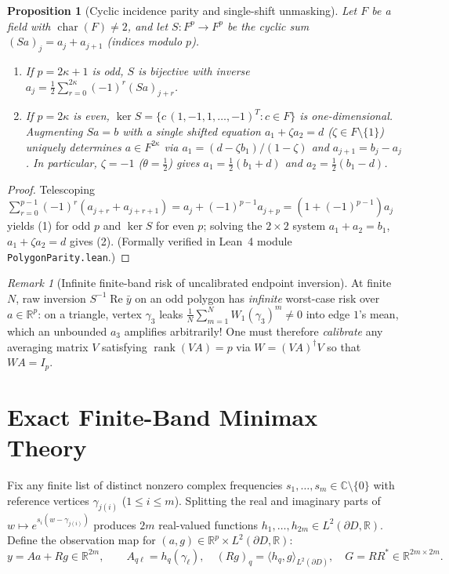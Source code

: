 \documentclass[11pt,reqno]{amsart}
\newtheorem{proposition}[theorem]{Proposition}
\theoremstyle{definition}
\theoremstyle{remark}
\newtheorem{remark}[theorem]{Remark}
\newcommand{\C}{\mathbb{C}}
\newcommand{\R}{\mathbb{R}}
\begin{document}
\begin{proposition}[Cyclic incidence parity and single-shift unmasking]\label{prop:parity}
Let $F$ be a field with $\operatorname{char}(F) \ne 2$, and let $S : F^p \to F^p$ be the cyclic sum $(S a)_j = a_j + a_{j+1}$ (indices modulo $p$).
\begin{enumerate}
  \item If $p = 2\kappa+1$ is odd, $S$ is bijective with inverse $a_j = \frac{1}{2}\sum_{r=0}^{2\kappa} (-1)^r (S a)_{j+r}$.
  \item If $p = 2\kappa$ is even, $\ker S = \{c\,(1, -1, 1, \dots, -1)^T : c \in F\}$ is one-dimensional. Augmenting $S a = b$ with a single shifted equation $a_1 + \zeta a_2 = d$ ($\zeta \in F \setminus \{1\}$) uniquely determines $a \in F^{2\kappa}$ via $a_1 = (d - \zeta b_1)/(1 - \zeta)$ and $a_{j+1} = b_j - a_j$. In particular, $\zeta = -1$ ($\theta = \frac12$) gives $a_1 = \frac12(b_1 + d)$ and $a_2 = \frac12(b_1 - d)$.
\end{enumerate}
\end{proposition}

\begin{proof}
Telescoping $\sum_{r=0}^{p-1} (-1)^r (a_{j+r} + a_{j+r+1}) = a_j + (-1)^{p-1} a_{j+p} = (1 + (-1)^{p-1}) a_j$ yields (1) for odd $p$ and $\ker S$ for even $p$; solving the $2\times 2$ system $a_1 + a_2 = b_1$, $a_1 + \zeta a_2 = d$ gives (2). (Formally verified in Lean~4 module \texttt{PolygonParity.lean}.)
\end{proof}

\begin{remark}[Infinite finite-band risk of uncalibrated endpoint inversion]\label{rem:calibration}
At finite $N$, raw inversion $S^{-1}\operatorname{Re}\bar y$ on an odd polygon has \emph{infinite} worst-case risk over $a \in \R^p$: on a triangle, vertex $\gamma_3$ leaks $\frac{1}{N}\sum_{m=1}^N W_1(\gamma_3)^m \ne 0$ into edge $1$'s mean, which an unbounded $a_3$ amplifies arbitrarily! One must therefore \emph{calibrate} any averaging matrix $V$ satisfying $\operatorname{rank}(V A) = p$ via $W = (V A)^\dagger V$ so that $W A = I_p$.
\end{remark}

\section{Exact Finite-Band Minimax Theory}\label{sec:minimax}

Fix any finite list of distinct nonzero complex frequencies $s_1,\dots,s_m \in \C \setminus \{0\}$ with reference vertices $\gamma_{j(i)}$ ($1 \le i \le m$). Splitting the real and imaginary parts of $w \mapsto e^{s_i(w - \gamma_{j(i)})}$ produces $2m$ real-valued functions $h_1,\dots,h_{2m} \in L^2(\partial D, \R)$. Define the observation map for $(a, g) \in \R^p \times L^2(\partial D, \R)$:
\begin{equation}\label{eq:obs-model}
  y = A a + R g \in \R^{2m}, \qquad A_{q\ell} = h_q(\gamma_\ell), \quad (R g)_q = \langle h_q, g \rangle_{L^2(\partial D)}, \quad G = R R^* \in \R^{2m\times 2m}.
\end{equation}
\end{document}
